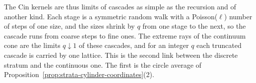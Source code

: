 The Cin kernels are thus limits of cascades as simple as the \Matern{} recursion and of another
kind. Each stage is a symmetric random walk with a Poisson($\ell$) number of steps of one size, and
the sizes shrink by $q$ from one stage to the next, so the cascade runs from coarse steps to fine
ones. The extreme rays of the continuum cone are the limits $q \downarrow 1$ of these cascades, and
for an integer $q$ each truncated cascade is carried by one lattice. This is the second link between
the discrete stratum and the continuous one. The first is the circle average of
Proposition~\ref{prop:strata-cylinder-coordinates}(2).

